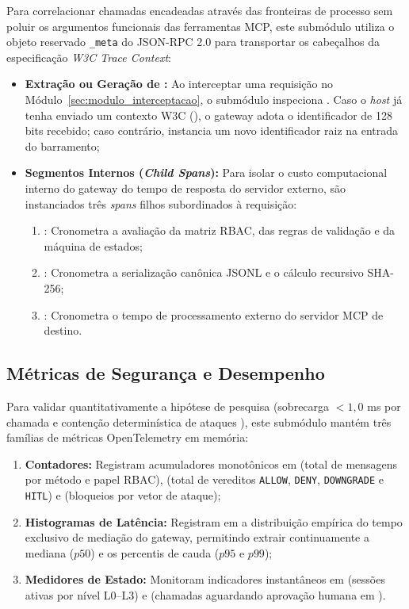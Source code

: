 Para correlacionar chamadas encadeadas através das fronteiras de processo sem poluir os argumentos funcionais das ferramentas MCP, este submódulo utiliza o objeto reservado \texttt{\_meta} do JSON-RPC 2.0 para transportar os cabeçalhos da especificação \textit{W3C Trace Context}:
\begin{itemize}
  \item \textbf{Extração ou Geração de :} Ao interceptar uma requisição no Módulo~\ref{sec:modulo_interceptacao}, o submódulo inspeciona . Caso o \textit{host} já tenha enviado um contexto W3C (), o gateway adota o identificador de 128 bits recebido; caso contrário, instancia um novo identificador raiz na entrada do barramento;
  \item \textbf{Segmentos Internos (\textit{Child Spans}):} Para isolar o custo computacional interno do gateway do tempo de resposta do servidor externo, são instanciados três \textit{spans} filhos subordinados à requisição:
  \begin{enumerate}
    \item {}: Cronometra a avaliação da matriz RBAC, das regras de validação e da máquina de estados;
    \item {}: Cronometra a serialização canônica JSONL e o cálculo recursivo SHA-256;
    \item {}: Cronometra o tempo de processamento externo do servidor MCP de destino.
  \end{enumerate}
\end{itemize}

\subsection{Métricas de Segurança e Desempenho}
\label{subsec:metricas_seguranca_desempenho}

Para validar quantitativamente a hipótese de pesquisa (sobrecarga $< 1{,}0$ ms por chamada e contenção determinística de ataques \cite{singh2026mcpsecure}), este submódulo mantém três famílias de métricas OpenTelemetry em memória:
\begin{enumerate}
  \item \textbf{Contadores:} Registram acumuladores monotônicos em  (total de mensagens por método e papel RBAC),  (total de vereditos \texttt{ALLOW}, \texttt{DENY}, \texttt{DOWNGRADE} e \texttt{HITL}) e  (bloqueios por vetor de ataque);
  \item \textbf{Histogramas de Latência:} Registram em  a distribuição empírica do tempo exclusivo de mediação do gateway, permitindo extrair continuamente a mediana ($p50$) e os percentis de cauda ($p95$ e $p99$);
  \item \textbf{Medidores de Estado:} Monitoram indicadores instantâneos em  (sessões ativas por nível L0--L3) e  (chamadas aguardando aprovação humana em ).
\end{enumerate}

